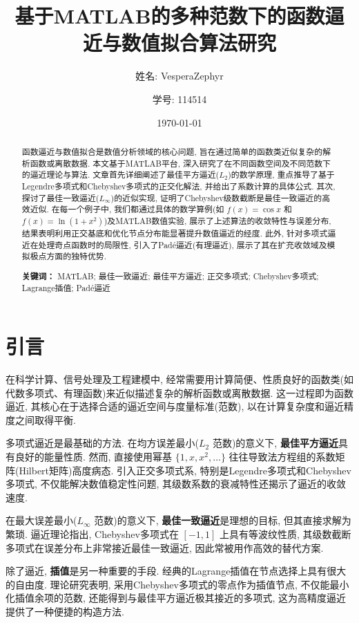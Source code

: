 \documentclass[UTF8, a4paper, 11pt]{ctexart}
\title{\textbf{基于MATLAB的多种范数下的函数逼近与数值拟合算法研究}}
\author{姓名: VesperaZephyr\and 学号: 114514}
\date{\today}
\begin{document}
\maketitle

\begin{abstract}
函数逼近与数值拟合是数值分析领域的核心问题, 旨在通过简单的函数类近似复杂的解析函数或离散数据. 本文基于MATLAB平台, 深入研究了在不同函数空间及不同范数下的逼近理论与算法. 文章首先详细阐述了最佳平方逼近($L_2$)的数学原理, 重点推导了基于Legendre多项式和Chebyshev多项式的正交化解法, 并给出了系数计算的具体公式. 其次, 探讨了最佳一致逼近($L_\infty$)的近似实现, 证明了Chebyshev级数截断是最佳一致逼近的高效近似. 在每一个例子中, 我们都通过具体的数学算例(如 $f(x)=\cos x$ 和 $f(x)=\ln(1+x^2)$)及MATLAB数值实验, 展示了上述算法的收敛特性与误差分布, 结果表明利用正交基底和优化节点分布能显著提升数值逼近的经度. 此外, 针对多项式逼近在处理奇点函数时的局限性, 引入了Padé逼近(有理逼近), 展示了其在扩充收敛域及模拟极点方面的独特优势. 

\textbf{关键词：} MATLAB; 最佳一致逼近; 最佳平方逼近; 正交多项式; Chebyshev多项式; Lagrange插值; Padé逼近
\end{abstract}
\newpage
\tableofcontents
\newpage

\section{引言}
在科学计算、信号处理及工程建模中, 经常需要用计算简便、性质良好的函数类(如代数多项式、有理函数)来近似描述复杂的解析函数或离散数据. 这一过程即为函数逼近, 其核心在于选择合适的逼近空间与度量标准(范数), 以在计算复杂度和逼近精度之间取得平衡. 

多项式逼近是最基础的方法. 在均方误差最小($L_2$ 范数)的意义下, \textbf{最佳平方逼近}具有良好的能量性质. 然而, 直接使用幂基 $\{1, x, x^2, \dots\}$ 往往导致法方程组的系数矩阵(Hilbert矩阵)高度病态. 引入正交多项式系, 特别是Legendre多项式和Chebyshev多项式, 不仅能解决数值稳定性问题, 其级数系数的衰减特性还揭示了逼近的收敛速度. 

在最大误差最小($L_\infty$ 范数)的意义下, \textbf{最佳一致逼近}是理想的目标, 但其直接求解为繁琐. 逼近理论指出, Chebyshev多项式在 $[-1, 1]$ 上具有等波纹性质, 其级数截断多项式在误差分布上非常接近最佳一致逼近, 因此常被用作高效的替代方案. 

除了逼近, \textbf{插值}是另一种重要的手段. 经典的Lagrange插值在节点选择上具有很大的自由度. 理论研究表明, 采用Chebyshev多项式的零点作为插值节点, 不仅能最小化插值余项的范数, 还能得到与最佳平方逼近极其接近的多项式, 这为高精度逼近提供了一种便捷的构造方法. 
\end{document}
